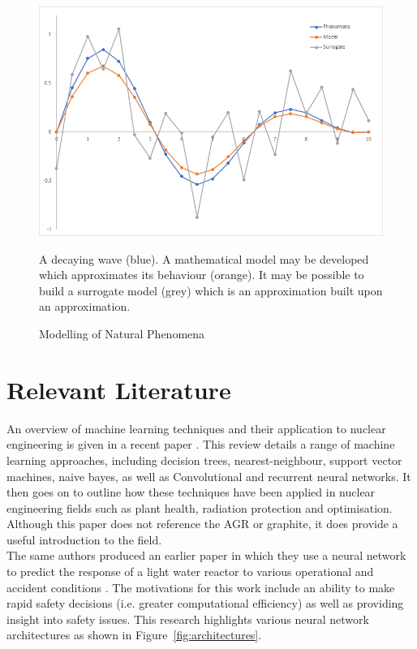 \begin{figure}[p]
	\centering
	\includegraphics[scale=0.65]{Figures/surrogate_model.png}
	\caption{Modelling of Natural Phenomena} {A decaying wave (blue). A mathematical model may be developed which approximates its behaviour (orange). It may be possible to build a surrogate model (grey) which is an approximation built upon an approximation.}
	\label{fig:surrogate}
\end{figure}

\section{Relevant Literature}

An overview of machine learning techniques and their application to nuclear engineering is given in a recent paper \cite{gomez2020status}. This review details a range of machine learning approaches, including decision trees, nearest-neighbour, support vector machines, naive bayes, as well as Convolutional and recurrent neural networks. It then goes on to outline how these techniques have been applied in nuclear engineering fields such as plant health, radiation protection and optimisation. Although this paper does not reference the AGR or graphite, it does provide a useful introduction to the field. 
\\

\noindent
The same authors produced an earlier paper in which they use a neural network to predict the response of a light water reactor to various operational and accident conditions \cite{fernandez2017nuclear}. The motivations for this work include an ability to make rapid safety decisions (i.e. greater computational efficiency) as well as providing insight into safety issues. This research highlights various neural network architectures as shown in Figure~\ref{fig:architectures}.  
\\

